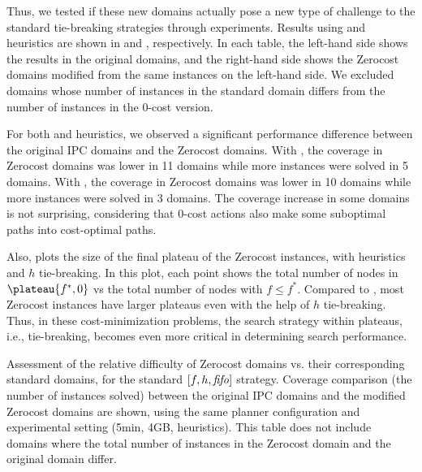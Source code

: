 Thus, we tested if these new domains actually pose a new type of challenge to the
standard tie-breaking strategies through experiments. Results using \lmcut and \mands
heuristics are shown in  and
, respectively. In each table,
the left-hand side shows the results in the original domains, and the right-hand side
shows the Zerocost domains modified from the same
instances on the left-hand side. We excluded domains whose
number of instances in the standard domain differs from the number of instances in the 0-cost version.

For both \lmcut and \mands heuristics, we observed a significant
performance difference between the original IPC domains and the Zerocost
domains. With \lmcut, the coverage in Zerocost domains
was lower in 11 domains while more instances were solved
in 5 domains. With \mands, the coverage in Zerocost domains was lower in 10 domains while
more instances were solved in 3 domains.
The coverage increase in some domains is not surprising, considering that 0-cost actions also make some suboptimal paths into cost-optimal paths.

Also,  plots the size of the final plateau of the
Zerocost instances, with \lmcut heuristics and $h$ tie-breaking. In this plot,
each point shows the total number of nodes in $\plateau{f^*,0}$ vs the
total number of nodes with $f\leq f^*$. Compared to ,
most Zerocost instances have larger plateaus even with the help of
$h$ tie-breaking.  Thus, in these cost-minimization problems, the search
strategy within plateaus, i.e., tie-breaking, becomes even more critical
in determining search performance.


\begin{table}[htbp]
 \centering
 
 \caption{
 Assessment of the relative difficulty of Zerocost domains vs. their corresponding standard domains, for the standard $[f,h,{\text{\textit{fifo}}}]$ strategy.
 Coverage comparison (the number of instances solved) 
 between the original IPC domains and the modified Zerocost domains are shown, 
 using the same planner configuration and experimental setting (5min, 4GB, \lmcut heuristics).
 This table does not include domains where the total number of instances
 in the Zerocost domain  and the original domain differ. 
 }
 \label{tbl:lmcut-zerocost-std}
\end{table}

